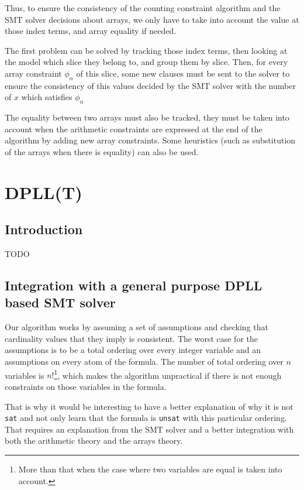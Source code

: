 \documentclass[]{article}
\begin{document}
{Thus, to ensure the consistency of the counting constraint algorithm and
the SMT solver decisions about arrays, we only have to take into account
the value at those index terms, and array equality if needed.

The first problem can be solved by tracking those index terms, then
looking at the model which slice they belong to, and group them by
slice. Then, for every array constraint $\phi_\alpha$ of this slice,
some new clauses must be sent to the solver to ensure the consistency of
this values decided by the SMT solver with the number of $x$ which
satisfies $\phi_\alpha$

The equality between two arrays must also be tracked, they must be taken
into account when the arithmetic constraints are expressed at the end of
the algorithm by adding new array constraints. Some heuristics (such as
substitution of the arrays when there is equality) can also be used.

\section{DPLL(T)}\label{dpllt}

\subsection{Introduction}\label{introduction-1}

TODO

\subsection{Integration with a general purpose DPLL based SMT
solver}\label{integration-with-a-general-purpose-dpll-based-smt-solver}

Our algorithm works by assuming a set of assumptions and checking that
cardinality values that they imply is consistent. The worst case for the
assumptions is to be a total ordering over every integer variable and an
assumptions on every atom of the formula. The number of total ordering
over $n$ variables is
$n!$\footnote{More than that when the case where two variables are equal is taken into account.},
which makes the algorithm unpractical if there is not enough constraints
on those variables in the formula.

That is why it would be interesting to have a better explanation of why
it is not \texttt{sat} and not only learn that the formula is
\texttt{unsat} with this particular ordering. That requires an
explanation from the SMT solver and a better integration with both the
arithmetic theory and the arrays theory.

}
\end{document}

